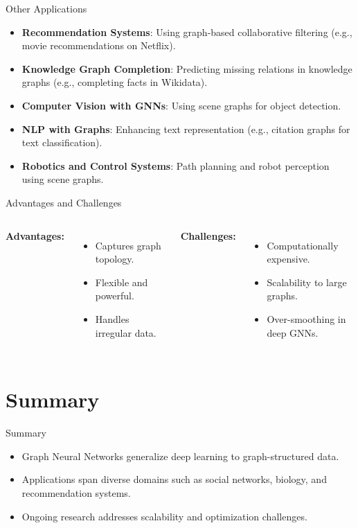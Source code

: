 \documentclass{beamer}
\begin{document}
\begin{frame}{Other Applications}
    \begin{itemize}
        \item \textbf{Recommendation Systems}: Using graph-based collaborative filtering (e.g., movie recommendations on Netflix).
        \item \textbf{Knowledge Graph Completion}: Predicting missing relations in knowledge graphs (e.g., completing facts in Wikidata).
        \item \textbf{Computer Vision with GNNs}: Using scene graphs for object detection.
        \item \textbf{NLP with Graphs}: Enhancing text representation (e.g., citation graphs for text classification).
        \item \textbf{Robotics and Control Systems}: Path planning and robot perception using scene graphs.
    \end{itemize}
\end{frame}

\begin{frame}{Advantages and Challenges}
    \begin{columns}
        \textbf{Advantages:}
        \begin{itemize}
            \item Captures graph topology.
            \item Flexible and powerful.
            \item Handles irregular data.
        \end{itemize}

        \textbf{Challenges:}
        \begin{itemize}
            \item Computationally expensive.
            \item Scalability to large graphs.
            \item Over-smoothing in deep GNNs.
        \end{itemize}
    \end{columns}
\end{frame}

\section{Summary}
\begin{frame}{Summary}
    \begin{itemize}
        \item Graph Neural Networks generalize deep learning to graph-structured data.
        \item Applications span diverse domains such as social networks, biology, and recommendation systems.
        \item Ongoing research addresses scalability and optimization challenges.
    \end{itemize}
\end{frame}
\end{document}
